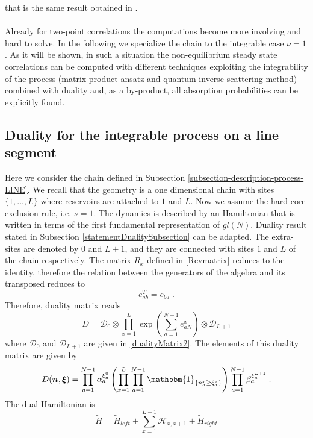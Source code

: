 \documentclass[10pt]{article}
\numberwithin{equation}{section}
\numberwithin{equation}{subsection}
\newcommand{\dt}{\;.}
\begin{document}
that is the same result obtained in \cite{vanicat2017exact}. 
\\
\\ Already for two-point correlations the computations become more involving and hard to solve. In the following we specialize the chain to the integrable case $\nu=1$. As it will be shown, in such a situation the non-equilibrium steady state correlations can be computed with different techniques exploiting the integrability of the process (matrix product ansatz and quantum inverse scattering method) combined with duality and, as a by-product, all absorption probabilities can be explicitly found. 
\subsection{Duality for the integrable process on a line segment}\label{integrableChain-duality}
Here we consider the chain defined in Subsection \ref{subsection-description-process-LINE}. We recall that the geometry is a one dimensional chain with sites $\{1,\ldots,L\}$ where reservoirs are attached to $1$ and $L$. Now we assume the hard-core exclusion rule, i.e. $\nu=1$. The dynamics is described by an Hamiltonian that is written in terms of the first fundamental representation of $gl(N)$. Duality result stated in Subsection \ref{statementDualitySubsection} can be adapted. The extra-sites are denoted by $0$ and $L+1$, and they are connected with sites $1$ and $L$ of the chain respectively. The matrix $R_{x}$ defined in \eqref{Revmatrix} 
reduces to the identity, therefore the relation between the generators of the algebra and its transposed reduces to
\begin{equation}\label{transpostionPropertyFund}
	e_{ab}^T= e_{ba}\dt
\end{equation}
Therefore, duality matrix reads
\begin{equation}
	D=\mathcal{D}_{0}\otimes\prod_{x=1}^{L}\exp{\left(\sum_{a=1}^{N-1}e_{aN}^{x}\right)}\otimes \mathcal{D}_{L+1}
\end{equation}
where $\mathcal{D}_{0}$ and $\mathcal{D}_{L+1}$ are given in \eqref{dualityMatrix2}. 
The elements of this duality matrix are given by
\begin{equation}\label{ElementsDualityMatrixChain}
	D(\bm{n},\bm{\xi})=\prod_{a=1}^{N-1}\alpha_{a}^{\xi_{a}^{0}}\left(\prod_{x=1}^{L}\prod_{a=1}^{N-1}\mathbbm{1}_{\{n_{a}^{x}\geq \xi_{a}^{x}\}}\right)\prod_{a=1}^{N-1}\beta_{a}^{\xi_{a}^{L+1}}\dt
\end{equation}
The dual Hamiltonian is
\begin{equation}
	\widetilde{H}=\widetilde{H}_{left}+\sum_{x=1}^{L-1}\mathcal{H}_{x,x+1}+\widetilde{H}_{right}
\end{equation}
\end{document}
